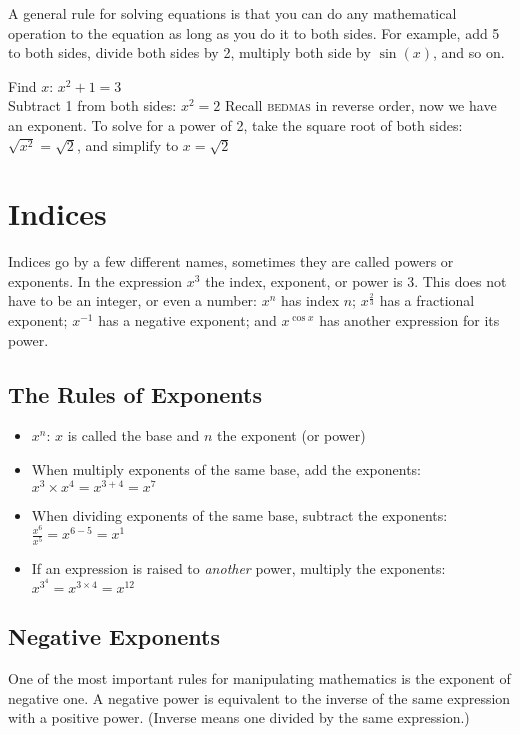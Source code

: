 \begin{tcolorbox}
A general rule for solving equations is that you can do any mathematical operation to the equation as long as you do it to both sides. For example, add 5 to both sides, divide both sides by 2, multiply both side by $\sin(x)$, and so on.
\end{tcolorbox}

\example Find $x$: $x^2+1=3$\medskip\\
\solution Subtract 1 from both sides: $x^2=2$ Recall \textsc{bedmas} in reverse order, now we have an exponent. To solve for a power of 2, take the square root of both sides: $\sqrt{x^2}=\sqrt{2}$, and simplify to $x=\sqrt{2}$

\section*{Indices}
Indices go by a few different names, sometimes they are called powers or exponents. In the expression $x^3$ the index, exponent, or power is $3$. This does not have to be an integer, or even a number: $x^n$ has index $n$; $x^{\frac{2}{3}}$ has a fractional exponent; $x^{-1}$ has a negative exponent; and $x^{\cos x}$ has another expression for its power.

\subsection*{The Rules of Exponents}
\begin{tcolorbox}
	\begin{itemize}
		\item $x^n$: $x$ is called the base and $n$ the exponent (or power)
		\item When multiply exponents of the same base, add the exponents: $x^3\times x^4=x^{3+4}=x^7$
		\item When dividing exponents of the same base, subtract the exponents:
		$\frac{x^6}{x^5}=x^{6-5}=x^1$
		\item If an expression is raised to \textit{another} power, multiply the exponents:
		$x^{3^4}=x^{3\times 4}=x^{12}$
	\end{itemize}
\end{tcolorbox}	

\subsection*{Negative Exponents}
One of the most important rules for manipulating mathematics is the exponent of negative one. A negative power is equivalent to the inverse of the same expression with a positive power. (Inverse means one divided by the same expression.)\\

